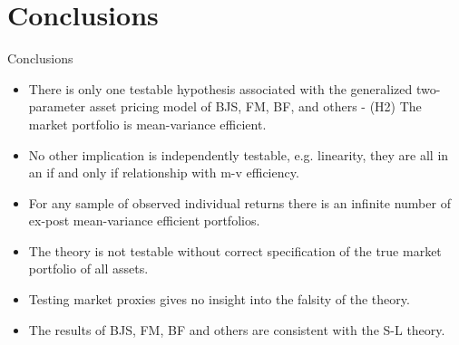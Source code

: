 \documentclass{beamer}
\begin{document}
\section{Conclusions}
\begin{frame}{Conclusions}
\begin{itemize}[<+->]
\item There is only one testable hypothesis associated with the generalized two-parameter asset pricing model of BJS, FM, BF, and others - (H2) The market portfolio is mean-variance efficient.
\item No other implication is independently testable, e.g. linearity, they are all in an if and only if relationship with m-v efficiency.
\item For any sample of observed individual returns there is an infinite number of ex-post mean-variance efficient portfolios. 
\item The theory is not testable without correct specification of the true market portfolio of all assets.
\item Testing market proxies gives no insight into the falsity of the theory.
\item The results of BJS, FM, BF and others are consistent with the S-L theory.
\end{itemize}

\end{frame}

% 
\end{document}
